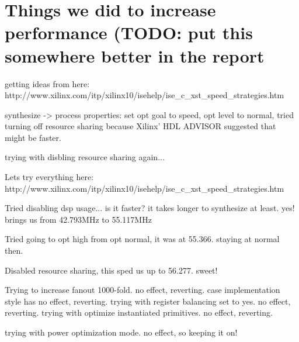 \bigskip

\section{Things we did to increase performance (TODO: put this somewhere better in the report}

getting ideas from here: http://www.xilinx.com/itp/xilinx10/isehelp/ise\_c\_xst\_speed\_strategies.htm

synthesize  -> process properties: set opt goal to speed, opt level to normal, tried turning off resource sharing because Xilinx' HDL ADVISOR suggested that might be faster.

trying with disbling resource sharing again...


Lets try everything here: http://www.xilinx.com/itp/xilinx10/isehelp/ise\_c\_xst\_speed\_strategies.htm

Tried disabling dsp usage... is it faster? it takes longer to synthesize at least. yes! brings us from 42.793MHz to 55.117MHz

Tried going to opt high from opt normal, it was at 55.366. staying at normal then.


Disabled resource sharing, this sped us up to 56.277. sweet!

Trying to increase fanout 1000-fold.  no effect, reverting.
case implementation style has no effect, reverting.
trying with register balancing set to yes. no effect, reverting.
trying with optimize instantiated primitives. no effect, reverting.

trying with power optimization mode. no effect, so keeping it on!

